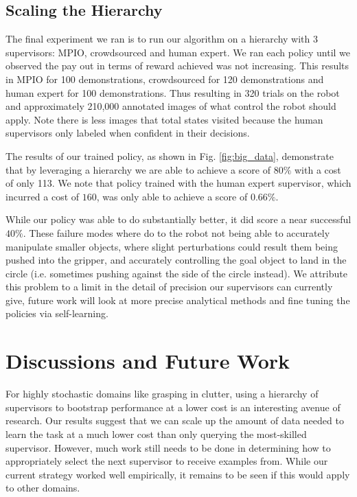 \documentclass[10pt, conference]{ieeeconf}      %
\begin{document}
\subsection{Scaling the Hierarchy}
The final experiment we ran is to run our algorithm on a hierarchy with 3 supervisors: MPIO, crowdsourced and human expert. We ran each policy until we observed the pay out in terms of reward achieved was not increasing. This results in MPIO for 100 demonstrations, crowdsourced for 120 demonstrations and human expert for 100 demonstrations. Thus resulting in 320 trials on the robot and approximately 210,000 annotated images of what control the robot should apply. Note there is less images that total states visited because the human supervisors only labeled when confident in their decisions. 

The results of our trained policy, as shown in Fig. \ref{fig:big_data}, demonstrate that by leveraging a hierarchy we are able to achieve a score of $80\%$ with a cost of only 113. We note that policy trained with the human expert supervisor, which incurred a cost of $160$, was only able to achieve a score of $0.66\%$. 

While our policy was able to do substantially better, it did score a near successful  $40\%$. These failure modes where do to the robot not being able to accurately manipulate smaller objects, where slight perturbations could result them being pushed into the gripper, and accurately controlling the goal object to land in the circle (i.e. sometimes pushing against the side of the circle instead). We attribute this problem to a limit in the detail of precision our supervisors can currently give, future work will look at more precise analytical methods and fine tuning the policies via self-learning. 




\section{Discussions and Future Work}
For highly stochastic domains like grasping in clutter, using a hierarchy of supervisors to bootstrap performance at a lower cost is an interesting avenue of research. Our results suggest that we can scale up the amount of data needed to learn the task at a much lower cost than only querying the most-skilled supervisor. However, much work still needs to be done in determining how to appropriately select the next supervisor to receive examples from. While our current strategy worked well empirically, it remains to be seen if this would apply to other domains. 
\end{document}
